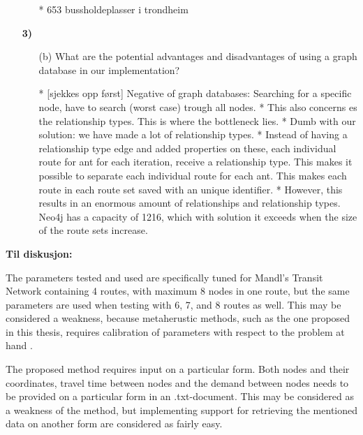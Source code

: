 \begin{enumerate}[label=\textbf{\arabic*})]
\begin{enumerate}
     * 653 bussholdeplasser i trondheim %
    \end{enumerate}
\item[\textbf{3)}]
	\begin{enumerate}
	\item[(b)]  What are the potential advantages and disadvantages of using a graph database in our implementation?

    * [sjekkes opp først] Negative of graph databases: Searching for a specific node, have to search (worst case) trough all nodes. 
    * This also concerns es the relationship types. This is where the bottleneck lies. 
    * Dumb with our solution: we have made a lot of relationship types. 
    * Instead of having a relationship type edge and added properties on these, each individual route for ant for each iteration, receive a relationship type. This makes it possible to separate each individual route for each ant. This makes each route in each route set saved with an unique identifier. 
    * However, this results in an enormous amount of relationships and relationship types. Neo4j has a capacity of 1216, which with solution it exceeds when the size of the route sets increase. 

    \end{enumerate}
\end{enumerate}

\textbf{\color{blue} Til diskusjon:}

The parameters tested and used are specifically tuned for Mandl's Transit Network containing 4 routes, with maximum 8 nodes in one route, but the same parameters are used when testing with 6, 7, and 8 routes as well. This may be considered a weakness, because metaherustic methods, such as the one proposed in this thesis, requires calibration of parameters with respect to the problem at hand \citep{dobslaw09}.

The proposed method requires input on a particular form. Both nodes and their coordinates, travel time between nodes and the demand between nodes needs to be provided on a particular form in an .txt-document. This may be considered as a weakness of the method, but implementing support for retrieving the mentioned data on another form are considered as fairly easy.

